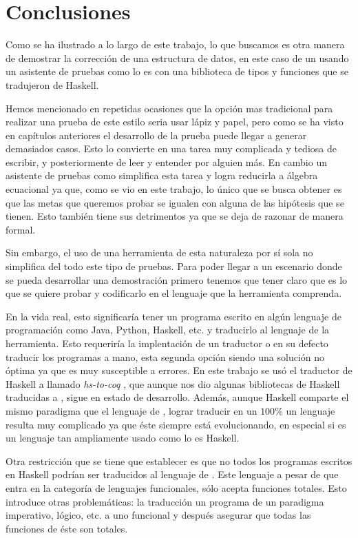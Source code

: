 \chapter*{Conclusiones}
Como se ha ilustrado a lo largo de este trabajo, lo que buscamos es otra manera de demostrar la 
correcci\'on de una estructura de datos, en este caso de un {\arn} usando un asistente de pruebas 
como lo es {\coq} con una biblioteca de tipos y funciones que se tradujeron de Haskell.

Hemos mencionado en repetidas ocasiones que la opci\'on mas tradicional para realizar una prueba de 
este estilo seria usar lápiz y papel, pero como se ha visto en capítulos anteriores el desarrollo de
la prueba puede llegar a generar demasiados casos. Esto lo convierte en una tarea muy complicada y 
tediosa de escribir, y posteriormente de leer y entender por alguien m\'as. En cambio un asistente de 
pruebas como {\coq} simplifica esta tarea y logra reducirla a álgebra 
ecuacional ya que, como se vio en este trabajo, lo \'unico que se busca obtener es que las metas que 
queremos probar se igualen con alguna de las hip\'otesis que se tienen. Esto también tiene sus 
detrimentos ya que se deja de razonar de manera formal.

Sin embargo, el uso de una herramienta de esta naturaleza por s\'i sola no simplifica del todo este
tipo de pruebas. Para poder llegar a un escenario donde se pueda desarrollar una 
demostraci\'on primero tenemos que tener claro que es lo que se quiere probar y codificarlo en el 
lenguaje que la herramienta comprenda.

En la vida real, esto significaría tener un programa escrito en algún lenguaje de programaci\'on
como Java, Python, Haskell, etc. y traducirlo al lenguaje de la herramienta. Esto requeriría la
implentaci\'on de un traductor o en su defecto traducir los programas a mano, esta segunda opci\'on
siendo una soluci\'on no \'optima ya que es muy susceptible a errores. En este trabajo se us\'o el
traductor de Haskell a {\coq} llamado \textit{hs-to-coq} \cite{thrc}, que aunque nos dio algunas 
bibliotecas de Haskell traducidas a {\coq}, sigue en estado de desarrollo. Adem\'as, aunque Haskell 
comparte el mismo paradigma que el lenguaje de {\coq}, lograr traducir en un $100\%$ un lenguaje 
resulta muy complicado ya que \'este siempre est\'a evolucionando, en especial si es un lenguaje tan 
ampliamente usado como lo es Haskell.

Otra restricci\'on que se tiene que establecer es que no todos los programas escritos en Haskell 
podrían ser traducidos al lenguaje de {\coq}. Este lenguaje a pesar de que entra en la categoría de 
lenguajes funcionales, s\'olo acepta funciones totales. Esto introduce otras 
problemáticas: la traducción un programa de un paradigma imperativo, l\'ogico, etc. a uno funcional 
y después asegurar que todas las funciones de \'este son totales.


